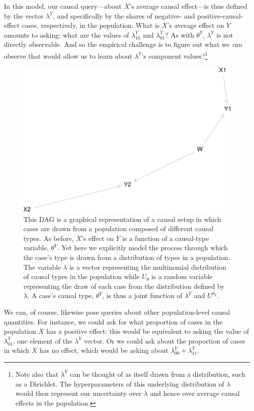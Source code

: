 \documentclass[12pt,]{book}
\let\rmarkdownfootnote\footnote%
\def\footnote{\protect\rmarkdownfootnote}
\begin{document}
In this model, our causal query---about \(X\)'s average causal effect---is thus defined by the vector \(\lambda^Y\), and specifically by the shares of negative- and positive-causal-effect cases, respectively, in the population. What is \(X\)'s average effect on \(Y\) amounts to asking: what are the values of \(\lambda^Y_{10}\) and \(\lambda^Y_{01}\)? As with \(\theta^Y\), \(\lambda^Y\) is not directly observable. And so the empirical challenge is to figure out what we \emph{can} observe that would allow us to learn about \(\lambda^Y\)'s component values?\footnote{Note also that \(\lambda^Y\) can be thought of as itself drawn from a distribution, such as a Dirichlet. The hyperparameters of this underlying distribution of \(\lambda\) would then represent our uncertainty over \(\lambda\) and hence over average causal effects in the population.}

\begin{figure}

{\centering \includegraphics[width=.5\textwidth]{ii_files/figure-latex/unnamed-chunk-17-1} 

}

\caption{\label{fig:DAGace} This DAG is a graphical representation of a causal setup in which cases are drawn from a population composed of different causal types. As before, $X$'s effect on $Y$ is a function of a causal-type variable, $\theta^Y$. Yet here we explicitly model the process through which the case's type is drawn from a distribution of types in a population. The variable $\lambda$ is a vector representing the multinomial distribution of causal types in the population while $U_\theta$ is a random variable representing the draw of each case from the distribution defined by $\lambda$. A case's causal type, $\theta^Y$, is thus a joint function of $\lambda^Y$ and $U^{\theta_Y}$.}\label{fig:unnamed-chunk-17}
\end{figure}

We can, of course, likewise pose queries about other population-level causal quantities. For instance, we could ask for what proportion of cases in the population \(X\) has a positive effect: this would be equivalent to asking the value of \(\lambda^Y_{01}\), one element of the \(\lambda^Y\) vector. Or we could ask about the proportion of cases in which \(X\) has no effect, which would be asking about \(\lambda^Y_{00} + \lambda^Y_{11}\).
\end{document}
